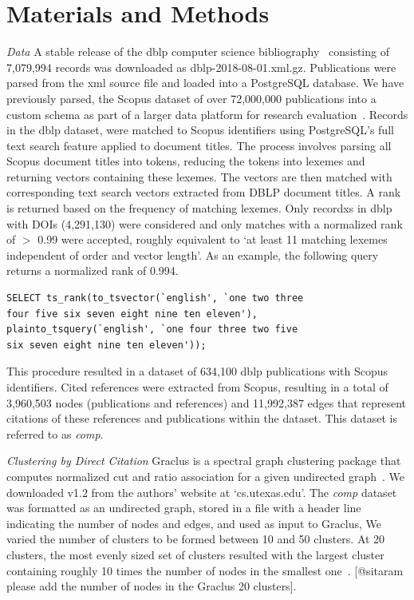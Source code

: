 \section{Materials and Methods}

\emph{Data} A stable release of the dblp computer science bibliography~\cite{dblp_ref} consisting of 7,079,994 records was downloaded as dblp-2018-08-01.xml.gz. Publications were parsed from the xml source file and loaded into a PostgreSQL database. We have previously parsed, the Scopus dataset of over 72,000,000 publications into a custom schema as part of a larger data platform for research evaluation~\cite{GithubERNIE2019}. Records in the dblp dataset, were matched to Scopus identifiers using PostgreSQL's full text search feature applied to document titles. The process involves parsing all Scopus document titles into tokens, reducing the tokens into lexemes and returning vectors containing these lexemes. The vectors are then matched with corresponding text search vectors extracted from DBLP document titles. A rank is returned based on the frequency of matching lexemes. Only recordxs in dblp with DOIs (4,291,130) were considered and only matches with a normalized rank of $>$ 0.99 were accepted, roughly equivalent to `at least 11 matching lexemes independent of order and vector length'. As an example, the following query returns a normalized rank of 0.994.
\begin{lstlisting}
SELECT ts_rank(to_tsvector(`english', `one two three 
four five six seven eight nine ten eleven'), 
plainto_tsquery(`english', `one four three two five 
six seven eight nine ten eleven')); 
\end{lstlisting}

This procedure resulted in a dataset of 634,100 dblp publications with Scopus identifiers. Cited references were extracted from Scopus, resulting in a total of 3,960,503 nodes (publications and references) and 11,992,387 edges that represent citations of these references and publications within the dataset. This dataset is referred to as \emph{comp}.\par

\emph{Clustering by Direct Citation} Graclus is a spectral graph clustering package that computes normalized cut and ratio association for a given undirected graph~\cite{graclus_2007}. We downloaded v1.2 from the authors' website at `cs.utexas.edu'. The \emph{comp} dataset was formatted as an undirected graph, stored in a file with a header line indicating the number of nodes and edges, and used as input to Graclus,  We varied the number of clusters to be formed between 10 and 50 clusters. At 20 clusters, the most evenly sized set of clusters resulted with the largest cluster containing roughly 10 times the number of nodes in the smallest one~\cite{traag_louvain_2019}. [@sitaram please add the number of nodes in the Graclus 20 clusters]. 

